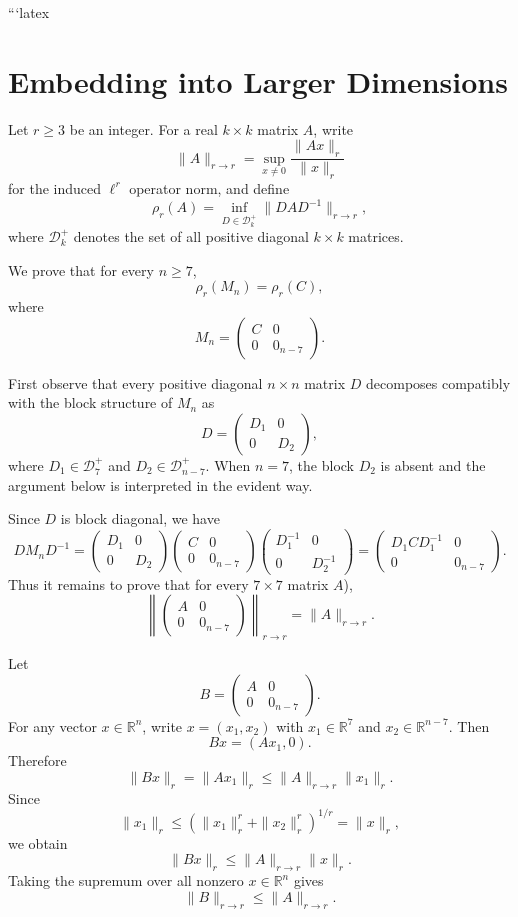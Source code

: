 ```latex
\section{Embedding into Larger Dimensions}

Let $r \geq 3$ be an integer. For a real $k \times k$ matrix $A$, write
\[
\|A\|_{r \to r}
=
\sup_{x \neq 0} \frac{\|Ax\|_r}{\|x\|_r}
\]
for the induced $\ell^r$ operator norm, and define
\[
\rho_r(A)
=
\inf_{D \in \mathcal{D}_k^+}
\|DAD^{-1}\|_{r \to r},
\]
where $\mathcal{D}_k^+$ denotes the set of all positive diagonal $k \times k$ matrices.

We prove that for every $n \geq 7$,
\[
\rho_r(M_n)=\rho_r(C),
\]
where
\[
M_n=
\begin{pmatrix}
C & 0\\
0 & 0_{n-7}
\end{pmatrix}.
\]

First observe that every positive diagonal $n \times n$ matrix $D$ decomposes compatibly with the block structure of $M_n$ as
\[
D=
\begin{pmatrix}
D_1 & 0\\
0 & D_2
\end{pmatrix},
\]
where $D_1 \in \mathcal{D}_7^+$ and $D_2 \in \mathcal{D}_{n-7}^+$. When $n=7$, the block $D_2$ is absent and the argument below is interpreted in the evident way.

Since $D$ is block diagonal, we have
\[
DM_nD^{-1}
=
\begin{pmatrix}
D_1 & 0\\
0 & D_2
\end{pmatrix}
\begin{pmatrix}
C & 0\\
0 & 0_{n-7}
\end{pmatrix}
\begin{pmatrix}
D_1^{-1} & 0\\
0 & D_2^{-1}
\end{pmatrix}
=
\begin{pmatrix}
D_1 C D_1^{-1} & 0\\
0 & 0_{n-7}
\end{pmatrix}.
\]
Thus it remains to prove that for every $7 \times 7$ matrix $A$),
\[
\left\|
\begin{pmatrix}
A & 0\\
0 & 0_{n-7}
\end{pmatrix}
\right\|_{r \to r}
=
\|A\|_{r \to r}.
\]

Let
\[
B=
\begin{pmatrix}
A & 0\\
0 & 0_{n-7}
\end{pmatrix}.
\]
For any vector $x \in \mathbb{R}^n$, write $x=(x_1,x_2)$ with $x_1 \in \mathbb{R}^7$ and $x_2 \in \mathbb{R}^{n-7}$. Then
\[
Bx=(Ax_1,0).
\]
Therefore
\[
\|Bx\|_r=\|Ax_1\|_r
\leq
\|A\|_{r \to r}\|x_1\|_r.
\]
Since
\[
\|x_1\|_r \leq \left(\|x_1\|_r^r+\|x_2\|_r^r\right)^{1/r}
=
\|x\|_r,
\]
we obtain
\[
\|Bx\|_r
\leq
\|A\|_{r \to r}\|x\|_r.
\]
Taking the supremum over all nonzero $x \in \mathbb{R}^n$ gives
\[
\|B\|_{r \to r} \leq \|A\|_{r \to r}.
\]

